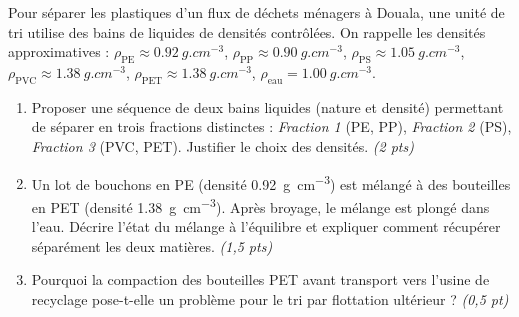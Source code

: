 \documentclass[11pt]{article}
\begin{document}
\begin{exercice}
Pour séparer les plastiques d'un flux de déchets ménagers à Douala, une unité de tri utilise des bains de liquides de densités contrôlées. On rappelle les densités approximatives : $\rho_{\text{PE}} \approx \SI{0,92}{g.cm^{-3}}$, $\rho_{\text{PP}} \approx \SI{0,90}{g.cm^{-3}}$, $\rho_{\text{PS}} \approx \SI{1,05}{g.cm^{-3}}$, $\rho_{\text{PVC}} \approx \SI{1,38}{g.cm^{-3}}$, $\rho_{\text{PET}} \approx \SI{1,38}{g.cm^{-3}}$, $\rho_{\text{eau}} = \SI{1,00}{g.cm^{-3}}$.
\begin{enumerate}
    \item Proposer une séquence de deux bains liquides (nature et densité) permettant de séparer en trois fractions distinctes : \textit{Fraction 1} (PE, PP), \textit{Fraction 2} (PS), \textit{Fraction 3} (PVC, PET). Justifier le choix des densités. \textit{(2 pts)}
    \item Un lot de bouchons en PE (densité \SI{0,92}{g.cm^{-3}}) est mélangé à des bouteilles en PET (densité \SI{1,38}{g.cm^{-3}}). Après broyage, le mélange est plongé dans l'eau. Décrire l'état du mélange à l'équilibre et expliquer comment récupérer séparément les deux matières. \textit{(1,5 pts)}
    \item Pourquoi la compaction des bouteilles PET avant transport vers l'usine de recyclage pose-t-elle un problème pour le tri par flottation ultérieur ? \textit{(0,5 pt)}
\end{enumerate}
\end{exercice}
\end{document}

